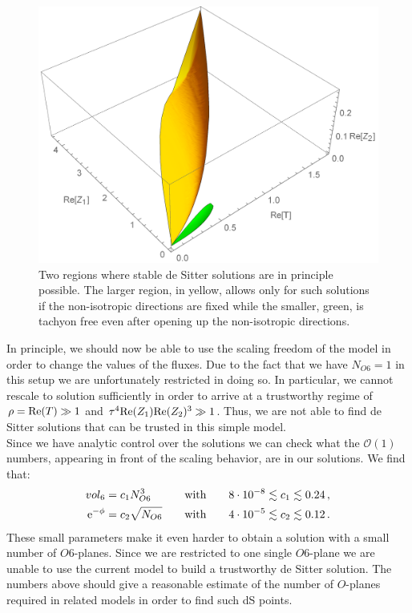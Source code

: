 \documentclass[a4paper,12pt,twoside,openright]{report}
\newcommand{\bea}{\begin{equation}\begin{aligned}}
\newcommand{\eea}{\end{aligned}\end{equation}}
\def\rme{{\rm e}}
\def\rmre{{\rm Re}}
\begin{document}
\begin{figure}[htb]
     \centering
     \includegraphics[scale=0.6]{tworegs.pdf}
     \caption{Two regions where stable de Sitter solutions are in principle possible. The larger region, in yellow, allows only for such solutions if the non-isotropic directions are fixed while the smaller, green, is tachyon free even after opening up the non-isotropic directions.}
     \label{fig:tworeg}
\end{figure}
In principle, we should now be able to use the scaling freedom of the model in order to change the values of the fluxes. Due to the fact that we have $N_{O6} = 1$ in this setup we are unfortunately restricted in doing so. In particular, we cannot rescale to solution sufficiently in order to arrive at a trustworthy regime of $\rho = \rmre(T) \gg 1 $ and $\tau^ 4 \rmre(Z_1) \rmre(Z_2)^ 3 \gg 1$. Thus, we are not able to find de Sitter solutions that can be trusted in this simple model.\\
Since we have analytic control over the solutions we can check what the $\mathcal{O}(1)$ numbers, appearing in front of the scaling behavior, are in our solutions. We find that:
\bea 
vol_6 &= c_1 N^ 3_{O6} \qquad\quad \text{with} \qquad 8 \cdot 10^ {-8} \lesssim c_1 \lesssim 0.24\,,\\
\rme^ {-\phi} &= c_2 \sqrt{N_{O6}} \qquad \text{with} \qquad 4 \cdot 10^ {-5} \lesssim c_2 \lesssim 0.12\,.
\eea
These small parameters make it even harder to obtain a solution with a small number of $O6$-planes. Since we are restricted to one single $O6$-plane we are unable to use the current model to build a trustworthy de Sitter solution. The numbers above should give a reasonable estimate of the number of $O$-planes required in related models in order to find such dS points.
\end{document}
